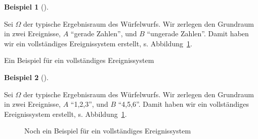\documentclass[
  ngerman,
  letterpaper,
  twoside,
  open=any]{scrbook}
\theoremstyle{definition}
\newtheorem{example}{Beispiel}[chapter]
\theoremstyle{plain}
\theoremstyle{definition}
\theoremstyle{definition}
\theoremstyle{remark}
\begin{document}
\begin{example}[]\protect\hypertarget{exm-vollereig1}{}\label{exm-vollereig1}

Sei \(\Omega\) der typische Ergebnisraum des Würfelwurfs. Wir zerlegen
den Grundraum in zwei Ereignisse, \(A\) \enquote{gerade Zahlen}, und
\(B\) \enquote{ungerade Zahlen}. Damit haben wir ein vollständiges
Ereignissystem erstellt, s. Abbildung~\ref{fig-complete-event-system1}.

\begin{figure}[H]


\caption{\label{fig-complete-event-system1}}

\end{figure}%

Ein Beispiel für ein vollständiges Ereignissystem

\end{example}

\begin{example}[]\protect\hypertarget{exm-vollereig2}{}\label{exm-vollereig2}

Sei \(\Omega\) der typische Ergebnisraum des Würfelwurfs. Wir zerlegen
den Grundraum in zwei Ereignisse, \(A\) \enquote{1,2,3}, und \(B\)
\enquote{4,5,6}. Damit haben wir ein vollständiges Ereignissystem
erstellt, s. Abbildung~\ref{fig-complete-event-system1}.

\begin{figure}[H]


\caption{\label{fig-fig-complete-event-system2}Noch ein Beispiel für ein
vollständiges Ereignissystem}

\end{figure}%

\end{example}
\end{document}
